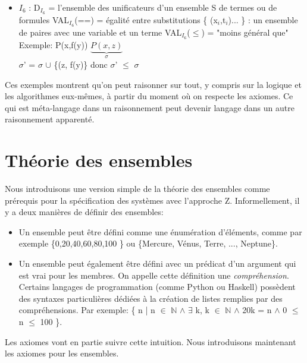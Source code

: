 {\begin{itemize}
\item \underline{$I_{6}$} : D$_{I_{6}}$ = l'ensemble des unificateurs d'un ensemble S de termes ou de formules
VAL$_{I_{6}}$(==) = égalité entre substitutions \{ (x$_{i}$,t$_{i}$)... \} : un ensemble de paires avec une variable et un terme VAL$_{I_{6}}$($\leq$) = "moins général que"\\
\newline
Exemple: P(x,f(y)) \hspace{1cm} $\underbrace{P(x,z)}_{\sigma}$\\
$\sigma$' = $\sigma$ $\cup$ \{(z, f(y)\} donc 
$\sigma$' $\leq$ $\sigma$\\
\end{itemize}
Ces exemples montrent qu'on peut raisonner sur tout, y compris sur la logique et les algorithmes eux-mêmes,
à partir du moment où on respecte les axiomes.
Ce qui est méta-langage dans un raisonnement peut devenir langage dans un autre raisonnement apparenté.



\section{Théorie des ensembles}

Nous introduisons une version simple de la théorie des ensembles
comme prérequis pour la spécification des systèmes avec l'approche Z.
Informellement, il y a deux manières de définir des ensembles:
\begin{itemize}
\item Un ensemble peut être défini comme une énumération d'éléments, comme par exemple
\{0,20,40,60,80,100 \} ou \{Mercure, Vénus, Terre, ..., Neptune\}.
\item Un ensemble peut également être défini avec un prédicat d'un argument qui est vrai pour les membres.
On appelle cette définition une {\em compréhension}.
Certains langages de programmation (comme Python ou Haskell) possèdent des syntaxes particulières dédiées
à la création de listes remplies par des compréhensions.
Par exemple: \{ n | n $\in$ $\mathbb{N}$ $\wedge$ $\exists$ k, k $\in$ $\mathbb{N}$ $\wedge$ 20k = n $\wedge$ 0 $\leq$ n $\leq$ 100 \}.
\end{itemize}
Les axiomes vont en partie suivre cette intuition.
Nous introduisons maintenant les axiomes pour les ensembles.

}
